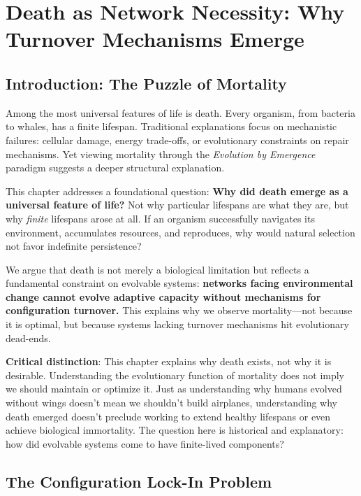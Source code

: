 \chapter{Death as Network Necessity: Why Turnover Mechanisms Emerge}
\label{ch:DeathTurnover}

\section{Introduction: The Puzzle of Mortality}

Among the most universal features of life is death. Every organism, from bacteria to whales, has a finite lifespan. Traditional explanations focus on mechanistic failures: cellular damage, energy trade-offs, or evolutionary constraints on repair mechanisms. Yet viewing mortality through the \emph{Evolution by Emergence} paradigm suggests a deeper structural explanation.

This chapter addresses a foundational question: \textbf{Why did death emerge as a universal feature of life?} Not why particular lifespans are what they are, but why \emph{finite} lifespans arose at all. If an organism successfully navigates its environment, accumulates resources, and reproduces, why would natural selection not favor indefinite persistence?

We argue that death is not merely a biological limitation but reflects a fundamental constraint on evolvable systems: \textbf{networks facing environmental change cannot evolve adaptive capacity without mechanisms for configuration turnover.} This explains why we observe mortality—not because it is optimal, but because systems lacking turnover mechanisms hit evolutionary dead-ends.

\textbf{Critical distinction}: This chapter explains why death exists, not why it is desirable. Understanding the evolutionary function of mortality does not imply we should maintain or optimize it. Just as understanding why humans evolved without wings doesn't mean we shouldn't build airplanes, understanding why death emerged doesn't preclude working to extend healthy lifespans or even achieve biological immortality. The question here is historical and explanatory: how did evolvable systems come to have finite-lived components?

\section{The Configuration Lock-In Problem}

